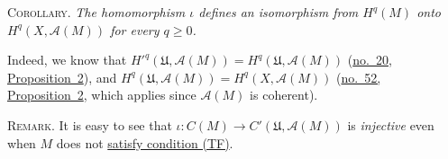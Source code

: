 \label{fac:III:3:no:64:cor}
\textsc{Corollary.} \textit{The homomorphism $\iota$ defines an
isomorphism from $H^q(M)$ onto $H^q(X,\mathcal{A}(M))$ for every
$q\geq0$.}

Indeed, we know that
$H'^q(\mathfrak{U},\mathcal{A}(M))=H^q(\mathfrak{U},\mathcal{A}(M))$
(\hyperref[fac:I:3:no:20:prop:2]{no.~20, Proposition~2}), and
$H^q(\mathfrak{U},\mathcal{A}(M))=H^q(X,\mathcal{A}(M))$
(\hyperref[fac:III:1:prop:2]{no.~52, Proposition~2}, which applies since
$\mathcal{A}(M)$ is coherent).

\label{fac:III:3:no:64:remark}
\textsc{Remark.} It is easy to see that
$\iota:C(M)\to C'(\mathfrak{U},\mathcal{A}(M))$ is \textit{injective}
even when $M$ does not
\hyperref[fac:III:2:no:56:def:TF]{satisfy condition (TF)}.
